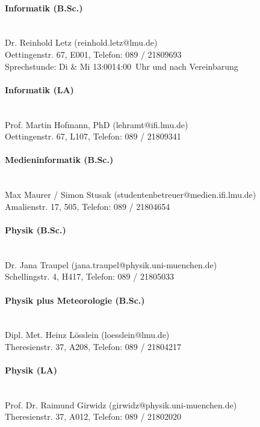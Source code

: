 \paragraph{Informatik (B.Sc.)}\hfill\\
Dr. Reinhold Letz (reinhold.letz@lmu.de)\\
Oettingenstr. 67, E001, Telefon: 089 / 2180\emd{}9693\\
Sprechstunde: Di \& Mi 13:00\emd{}14:00~Uhr und nach Vereinbarung

\paragraph{Informatik (LA)}\hfill\\
Prof. Martin Hofmann, PhD (lehramt@ifi.lmu.de)\\
Oettingenstr. 67, L107, Telefon: 089 / 2180\emd{}9341

\paragraph{Medieninformatik (B.Sc.)}\hfill\\
Max Maurer / Simon Stusak (studentenbetreuer@medien.ifi.lmu.de)\\
Amalienstr. 17, 505, Telefon: 089 / 2180\emd{}4654

\paragraph{Physik (B.Sc.)}\hfill\\
Dr. Jana Traupel (jana.traupel@physik.uni-muenchen.de)\\
Schellingstr. 4, H417, Telefon: 089 / 2180\emd{}5033

\paragraph{Physik plus Meteorologie (B.Sc.)}\hfill\\
Dipl. Met. Heinz Lösslein (loesslein@lmu.de)\\
Theresienstr. 37, A208, Telefon: 089 / 2180\emd{}4217

\paragraph{Physik (LA)}\hfill\\
Prof. Dr. Raimund Girwidz (girwidz@physik.uni-muenchen.de)\\
Theresienstr. 37, A012, Telefon: 089 / 2180\emd{}2020


